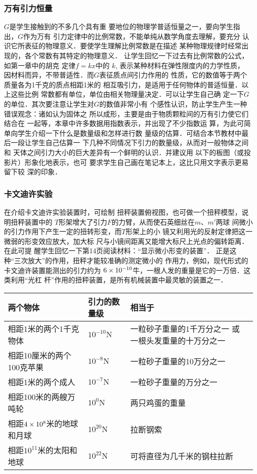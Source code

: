 \subsubsection{万有引力恒量} 
$G$是学生接触到的不多几个具有重
要地位的物理学普适恒量之一，要向学生指出，$G$作为万有
引力定律中的比例常数，不能单纯从数学角度去理解，要充分
认识它所表征的物理意义．要使学生理解比例常数是在描述
某种物理规律时经常出现的，各个常数有其特定的物理意义．
让学生回忆一下过去有比例常数的公式，如第一章中的胡克
定律$f=kx$中的 $k$, 表示某种材料在弹性限度内的力学性质，
因材料而异，不带普适性．而$G$表征质点间引力作用的
性质，它的数值等于两个质量各为1千克的质点相距1米的
相互吸引力，是适用于任何物体的普适恒量．以上这些比例
常数都有单位，单位由相关物理量决定．可以让学生自己确
定一下$G$的单位．其次要注意让学生对$G$的数值非常小有
个感性认识，防止学生产生一种错误观念：诸如认为固体之
所以成形，主要是由于物质颗粒间的万有引力使它们结合在
一起等，本章中许多数据用指数表示，并出现了不少指数运
算，为此可简单向学生介绍一下什么是数量级和怎样进行数
量级的估算．可结合本节教材中最后一段让学生自己估算一
下几种不同情况下引力的数量级，从而对一般物体之间和
天体之间引力大小的巨大差异有一个鲜明的认识．并建议用
以下的板图（或投影片）形象化地表示，也可
要求学生自己画在笔记本上，这比只用文字表示更易留下较
深的印象．

\subsubsection{卡文迪许实验}

在介绍卡文迪许实验装置时，可绘制
扭秤装置俯视图，也可做一个扭秤模型，说明扭秤装置中的
$T$形架增大了引力$F$的力臂，从而使石英细丝在$m$、$m'$两球
间微小的引力作用下产生一定的扭转形变，而$T$形架上的小
镜又利用光的反射定律把这一微弱的形变效应放大，加大标
尺与小镜间距离又能增大标尺上光点的偏转距离．在此可提
醒学生回忆一下第14页阅读材料：“显示微小形变的装置”．
正是这种“三次放大”的作用，扭秤才能较准确的测定微小的
作用力，例如，现代形式的卡文迪许装置能测出的引力约为
$6\times10^{-10}$牛，一根人发的重量是它的一万倍．这类利用“光杠
杆”作用的扭秤装置，是所有机械装置中最灵敏的装置之一．

\begin{center}
\begin{tabular}{p{}p{}p{}}
    \hline
    两个物体 &引力的数量级 &相当于\\
    \hline
相距1米的两个1千克物体 & $10^{-10}$N  &  一粒砂子重量的1千万分之一 或 一根头发重量的十万分之一\\
相距10厘米的两个100克苹果 & $10^{-8}$N  &  一粒砂子重量的10万分之一\\
相距1米的两个成人 & $10^{-7}$N  &  一粒砂子重量的万分之一\\
相距100米的两艘万吨轮 & $10^0$N  &  两只鸡蛋的重量\\
相距$4\times 10^8$米的地球和月球 & $10^{20}$N  & 拉断钢索\\
相距$10^{11}$米的太阳和地球 & $10^{22}$N  &  可将直径为几千米的钢柱拉断\\
    \hline
\end{tabular}
\end{center}

